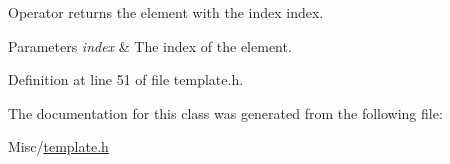 Operator returns the element with the index index. 


\begin{DoxyParams}{Parameters}
{\em index} & The index of the element. \\
\hline
\end{DoxyParams}


Definition at line 51 of file template.\-h.



The documentation for this class was generated from the following file\-:\begin{DoxyCompactItemize}
\item 
Misc/\hyperlink{template_8h}{template.\-h}\end{DoxyCompactItemize}
